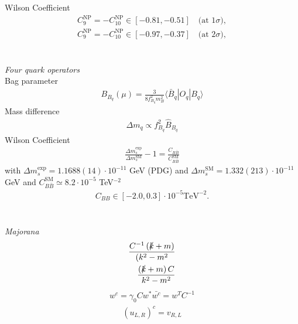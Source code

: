 Wilson Coefficient \cite{150306199} \cite{1608.07832}
\begin{align}
 C_9^\text{NP} = -C_{10}^\text{NP} \in [-0.81,-0.51]\quad \text{(at 1}\sigma),\\
 C_9^\text{NP} = -C_{10}^\text{NP} \in [-0.97,-0.37]\quad \text{(at 2}\sigma),
 \label{eq_mumuBound}
\end{align}
\\ \\ \textit{Four quark operators}\\
Bag parameter \cite{1607.00299}
\begin{align}
 B_{B_q}(\mu) = \frac{3}{8f_{B_q}^2 m_B^2} \langle \bar B_q |O_q|B_q \rangle
\end{align}
Mass difference \cite{1102.0009}
\begin{align}
 \Delta m_q \propto f^2_{B_q} \hat{B}_{B_q}
\end{align}
Wilson Coefficient
\begin{align}
 \frac{\Delta m_s^\text{exp}}{\Delta m_s^\text{SM}}-1 = \frac{C_{B\bar B}}{C^\text{SM}_{B\bar B}}
\end{align}
with $\Delta m_s^\text{exp} = 1.1688(14) \cdot 10^{-11}$ GeV (PDG) \cite{1602.03560} and $\Delta m_s^\text{SM} = 1.332(213)\cdot 10^{-11}$ GeV \cite{0612167}%
and $C_{B\bar B}^\text{SM} \simeq 8.2\cdot 10^{-5}$ TeV$^{-2}$ 
\begin{align}
 C_{BB} \in [-2.0,0.3] \cdot 10^{-5} \text{TeV}^{-2}.%
 \label{eq_mixBound}
\end{align}
\\ \\ \textit{Majorana}\\
\begin{equation}
\begin{aligned}
 \frac{C^{-1}\left(\slashed{k}+m\right)}{(k^2-m^2}\\
 \frac{\left(\slashed{k}+m\right)C}{k^2-m^2}
\end{aligned}
\label{eq_majoProp}
\end{equation}
\begin{equation}
\begin{aligned}
 w^c = \gamma_0 C w^*
 \bar {w^c}= w^T C^{-1}
\end{aligned}
\label{eq_ChargeConj}
\end{equation}
\cite{Fierz}
\begin{align}
 \left(u_{L,R}\right)^c = v_{R,L}
\end{align}



